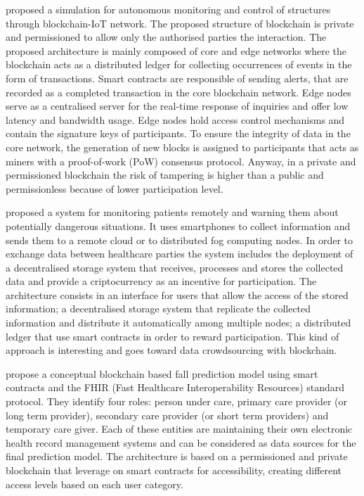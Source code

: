 \documentclass[preprint]{elsarticle}
\begin{document}
\citet{jo2018hybrid} proposed a simulation for autonomous monitoring and control of structures through blockchain-IoT network. The proposed structure of blockchain is private and permissioned to allow only the authorised parties the interaction. 
The proposed architecture is mainly composed of core and edge networks where the blockchain acts as a distributed ledger for collecting occurrences of events in the form of transactions. Smart contracts are responsible of sending alerts, that are recorded as a completed transaction in the core blockchain network. Edge nodes serve as a centralised server for the real-time response of inquiries and offer low latency and bandwidth usage. Edge nodes hold access control mechanisms and contain the signature keys of participants.
To ensure the integrity of data in the core network, the generation of new blocks is assigned to participants that acts as miners with a proof-of-work (PoW) consensus protocol. Anyway, in a private and permissioned blockchain the risk of tampering is higher than a public and permissionless because of lower participation level.

\citet{fernandez2019enabling} proposed a system for monitoring patients remotely and warning them about potentially dangerous situations. It uses smartphones to collect information and sends them to a remote cloud or to distributed fog computing nodes. In order to exchange data between healthcare parties the system includes the deployment of a decentralised storage system that receives, processes and stores the collected data and provide a criptocurrency as an incentive for participation. 
The architecture consists in an interface for users that allow the access of the stored information; a decentralised storage system that replicate the collected information and distribute it automatically among multiple nodes; a distributed ledger that use smart contracts in order to reward participation. This kind of approach is interesting and goes toward data crowdsourcing with blockchain.
 	 	
\citet{rupasinghe2019towards} propose a conceptual blockchain based fall prediction model using smart contracts and the FHIR (Fast Healthcare Interoperability Resources) standard protocol. They identify four roles: person under care, primary care provider (or long term provider), secondary care provider (or short term providers) and temporary care giver. Each of these entities are maintaining their own electronic health record management systems and can be considered as data sources for the final prediction model.
The architecture is based on a permissioned and private blockchain that leverage on smart contracts for accessibility, creating different access levels based on each user category. 
\end{document}
